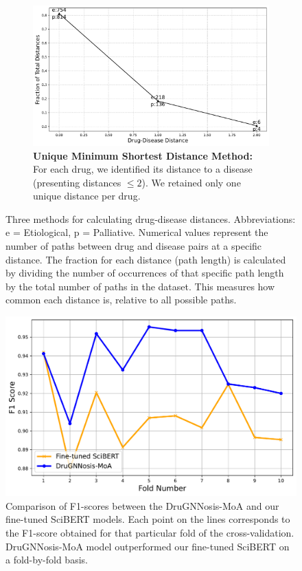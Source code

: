 \documentclass[journal,twoside,web]{ieeecolor}
\begin{document}
\begin{figure}
\begin{subfigure}{\linewidth}
   \label{fig:yildirim2}
\end{subfigure}
\begin{subfigure}{\linewidth}
   \includegraphics[width=\linewidth]{Figures/Yildrim_unique_minimum_shortest_distance.pdf}
   \caption{\textbf{Unique Minimum Shortest Distance Method:} 
    For each drug, we identified its distance to a disease (presenting distances $\leq 2$). 
    We retained only one unique distance per drug.
   }
   \label{fig:yildirim3}
\end{subfigure}
\caption{Three methods for calculating drug-disease distances.
Abbreviations: e = Etiological, p = Palliative. 
Numerical values represent the number of paths between drug and disease pairs at a specific distance. 
The fraction for each distance (path length) is calculated by dividing the number of occurrences of that specific path length by the total number of paths in the dataset.
This measures how common each distance is, relative to all possible paths.}
\label{fig:yildirim}
\end{figure}


\begin{figure}[h!]
\centering
   \includegraphics[width=\linewidth]{Figures/Comparison_F1_Scores_2_models.pdf}
   \caption{
    Comparison of F1-scores between the DruGNNosis-MoA and our fine-tuned SciBERT models.
   Each point on the lines corresponds to the F1-score obtained for that particular fold of the cross-validation.
   DruGNNosis-MoA model outperformed our fine-tuned SciBERT on a fold-by-fold basis.}
\label{fig:fscore1}
\end{figure}
\end{document}
